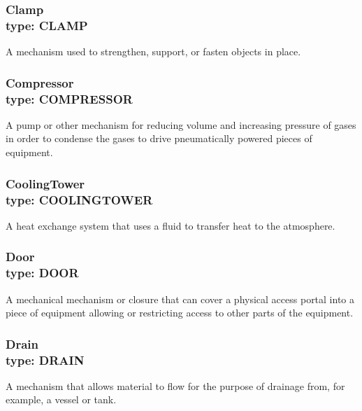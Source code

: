 \subsubsection[Clamp]{Clamp \\ {\small type: CLAMP}}
\label{sec:Clamp}



A mechanism used to strengthen, support, or fasten objects in place.


\subsubsection[Compressor]{Compressor \\ {\small type: COMPRESSOR}}
\label{sec:Compressor}



A pump or other mechanism for reducing volume and increasing pressure of gases in order to condense the gases to drive pneumatically powered pieces of equipment.


\subsubsection[CoolingTower]{CoolingTower \\ {\small type: COOLING\textunderscore TOWER}}
\label{sec:CoolingTower}



A heat exchange system that uses a fluid to transfer heat to the atmosphere.


\subsubsection[Door]{Door \\ {\small type: DOOR}}




A mechanical mechanism or closure that can cover a physical access portal into a piece of equipment allowing or restricting access to other parts of the equipment.


\subsubsection[Drain]{Drain \\ {\small type: DRAIN}}
\label{sec:Drain}



A mechanism that allows material to flow for the purpose of drainage from, for example, a vessel or tank.


